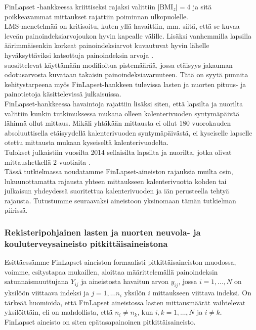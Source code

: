 \documentclass[finnish]{docopts}
\begin{document}
FinLapset -hankkeessa kriittiseksi rajaksi valittiin $|\text{BMI}_z| = 4$ ja sitä poikkeavammat mittaukset rajattiin poiminnan ulkopuolelle.\\

LMS-menetelmää on kritisoitu, kuten yllä havaittiin, mm. siitä, että se kuvaa leveän painoindeksiarvojoukon hyvin kapealle välille. Lisäksi vanhemmilla lapsilla äärimmäisenkin korkeat painoindeksiarvot kuvautuvat hyvin lähelle hyväksyttäviksi katsottuja painoindeksin arvoja \cite{flegal13, cdc13}. \\

\cite{flegal13} suosittelevat käyttämään modifioitua pistemäärää, jossa etäisyys jakauman odotusarvosta kuvataan takaisin painoindeksiavaruuteen. Tätä on syytä punnita kehitystarpeena myös FinLapset-hankkeen tulevissa lasten ja nuorten pituus- ja painotietoja käsittelevissä julkaisuissa. \\

FinLapset-hankkeessa havaintoja rajattiin lisäksi siten, että lapsilta ja nuorilta valittiin kunkin tutkimuksessa mukana olleen kalenterivuoden syntymäpäivää lähinnä ollut mittaus. Mikäli yhtäkään mittausta ei ollut 180 vuorokauden absoluuttisella etäisyydellä kalenterivuoden syntymäpäivästä, ei kyseiselle lapselle otettu mittausta mukaan kyseiseltä kalenterivuodelta. \\

Tulokset julkaistiin vuosilta 2014 sellaisilta lapsilta ja nuorilta, jotka olivat mittaushetkellä 2-vuotiaita \cite{finlapsetrekisteri}. \\

Tässä tutkielmassa noudatamme FinLapset-aineiston rajauksia muilta osin, lukuunottamatta rajausta yhteen mittaukseen kalenterivuotta kohden tai julkaisun yhdeydessä suoritettua kalenterivuoden ja iän perusteella tehtyä rajausta. Tutustumme seuraavaksi aineistoon yksinomaan tämän tutkielman piirissä.\\

\subsubsection{Rekisteripohjainen lasten ja nuorten neuvola- ja kouluterveysaineisto pitkittäisaineistona}
\label{ssb:rekpitkittais}

Esittäessämme FinLapset aineiston formaalisti pitkittäisaineiston muodossa, voimme, \cite{fitzmaurice11} esitystapaa mukaillen, aloittaa määrittelemällä painoindeksin satunnaismuuttujana $Y_{ij}$ ja aineistosta havaitun arvon $y_{ij}$, jossa $i = 1, \dots, N$ on yksilöön viittaava indeksi ja $j = 1, \dots n_i$ yksilön $i$ mittaukseen viittava indeksi. On tärkeää huomioida, että FinLapset aineistossa lasten mittausmäärät vaihtelevat yksilöittäin, eli on mahdollista, että $n_i \neq n_k$, kun $i,k = 1,\dots, N$ ja $i \neq k$. FinLapset aineisto on siten epätasapainoinen pitkittäisaineisto.\\
\end{document}
